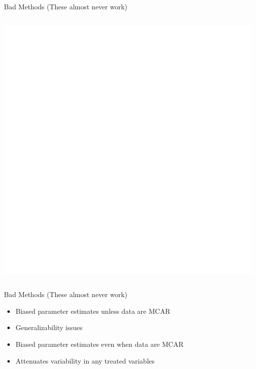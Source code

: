 \documentclass{beamer}\usepackage[]{graphicx}\usepackage[]{color}
\makeatletter
\def\maxwidth{ %
  \ifdim\Gin@nat@width>\linewidth
    \linewidth
  \else
    \Gin@nat@width
  \fi
}
\newenvironment{knitrout}{}{} %
\makeatother
\begin{document}
\begin{frame}{Bad Methods (These almost never work)}
\begin{columns}
\begin{column}{0.5\textwidth}
\begin{knitrout}
{\centering \includegraphics[width=\maxwidth]{figure/intro-unnamed-chunk-24-1} 

}


\end{knitrout}

\end{column}
\end{columns}

\end{frame}


\begin{frame}{Bad Methods (These almost never work)}
  
  \begin{center}
  \end{center}
  
  \begin{itemize}
  \item Biased parameter estimates unless data are MCAR
  \item Generalizability issues
  \end{itemize}
  
  \va
  
  \begin{center}
  \end{center}

  \begin{itemize}
  \item Biased parameter estimates even when data are MCAR
  \item Attenuates variability in any treated variables
  \end{itemize}
  
\end{frame}
\end{document}
